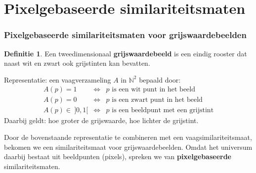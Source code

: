 \documentclass[dutch]{beamer}
\theoremstyle{definition}
\newtheorem{definitie}[theorem]{Definitie}
\theoremstyle{remark}
\theoremstyle{example}
\begin{document}
\section{Pixelgebaseerde similariteitsmaten}
\frame
{
  \frametitle{Pixelgebaseerde similariteitsmaten voor grijswaardebeelden}
  \begin{definitie}
  Een tweedimensionaal \textbf{grijswaardebeeld} is een eindig rooster dat
  naast wit en zwart ook grijstinten kan bevatten.
  \end{definitie}
  Representatie: een vaagverzameling $A$ in $\mathbb{N}^2$ bepaald door:
  \begin{displaymath}
  \begin{array}{rcl}
  A(p) = 1 & \iff & p \text{ is een wit punt in het beeld} \\
  A(p) = 0 & \iff & p \text{ is een zwart punt in het beeld} \\
  A(p) \in\ ]0,1[ & \iff & p \text{ is een beeldpunt met een grijstint}
  \end{array}
  \end{displaymath}
  Daarbij geldt: hoe groter de grijswaarde, hoe lichter de grijstint.
  
  \begin{flushleft}
  Door de bovenstaande representatie te combineren met een vaagsimilariteitsmaat,
  bekomen we een similariteitsmaat voor grijswaardebeelden. Omdat het universum
  daarbij bestaat uit beeldpunten (pixels), spreken we van
  \textbf{pixelgebaseerde} similariteitsmaten.
  \end{flushleft}
}
\frame
\end{document}
